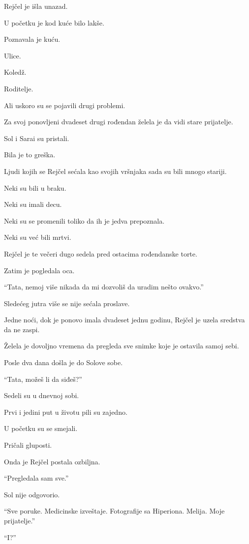 Rejčel je išla unazad.

\bigskip

U početku je kod kuće bilo lakše.

Poznavala je kuću.

Ulice.

Koledž.

Roditelje.

Ali uskoro su se pojavili drugi problemi.

Za svoj ponovljeni dvadeset drugi rođendan želela je da vidi stare prijatelje.

Sol i Sarai su pristali.

Bila je to greška.

Ljudi kojih se Rejčel sećala kao svojih vršnjaka sada su bili mnogo stariji.

Neki su bili u braku.

Neki su imali decu.

Neki su se promenili toliko da ih je jedva prepoznala.

Neki su već bili mrtvi.

Rejčel je te večeri dugo sedela pred ostacima rođendanske torte.

Zatim je pogledala oca.

``Tata, nemoj više nikada da mi dozvoliš da uradim nešto ovakvo.''

Sledećeg jutra više se nije sećala proslave.

\bigskip

Jedne noći, dok je ponovo imala dvadeset jednu godinu, Rejčel je uzela sredstva da ne zaspi.

Želela je dovoljno vremena da pregleda sve snimke koje je ostavila samoj sebi.

Posle dva dana došla je do Solove sobe.

``Tata, možeš li da siđeš?''

Sedeli su u dnevnoj sobi.

Prvi i jedini put u životu pili su zajedno.

U početku su se smejali.

Pričali gluposti.

Onda je Rejčel postala ozbiljna.

``Pregledala sam sve.''

Sol nije odgovorio.

``Sve poruke. Medicinske izveštaje. Fotografije sa Hiperiona. Melija. Moje prijatelje.''

``I?''

